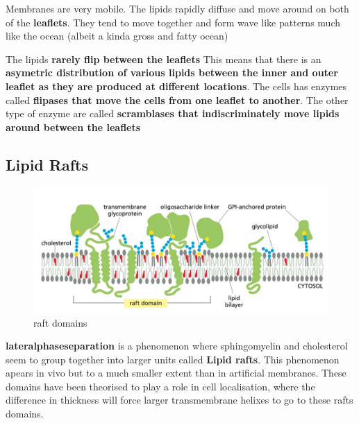 \documentclass[../main.tex]{subfiles}
\begin{document}
        
    Membranes are very mobile. The lipids rapidly diffuse and move around on both of the \textbf{leaflets}. They tend to move together and form wave like patterns much like the ocean (albeit a kinda gross and fatty ocean)
    \par
    The lipids \textbf{rarely flip between the leaflets} This means that there is an \textbf{asymetric distribution of various lipids between the inner and outer leaflet as they are produced at different locations}. The cells has enzymes called\textbf{ flipases that move the cells from one leaflet to another}. The other type of enzyme are called \textbf{scramblases that indiscriminately move lipids around between the leaflets}
       



    \subsection{Lipid Rafts}
    \begin{figure}[H]
        \centering
        \includegraphics[width=1\linewidth]{rafts.png}
        \caption{raft domains}
        \label{fig:enter-label}
    \end{figure}

    \textbf{\gls{lateralphaseseparation}} is a phenomenon where sphingomyelin and cholesterol seem to group together into larger units called \textbf{Lipid rafts}. This phenomenon apears in vivo but to a much smaller extent than in artificial membranes. These domains have been theorised to play a role in cell localisation, where the difference in thickness will force larger transmembrane helixes to go to these rafts domains.


\printglossaries
\end{document}
